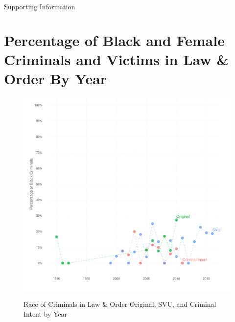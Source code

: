 \documentclass[12pt, letterpaper]{article}
\begin{document}
\begin{center}
\Large{Supporting Information}
\end{center}

\section{Percentage of Black and Female Criminals and Victims in Law \& Order By Year}
\label{si_figs}

\begin{figure}[htbp]
\centering
\caption{Race of Criminals in Law \& Order Original, SVU, and Criminal Intent by Year}
\includegraphics[scale=.9]{../figs/all_criminals_by_race_ts.pdf}
\label{fig:perp_race_ts}
\end{figure}
\end{document}
